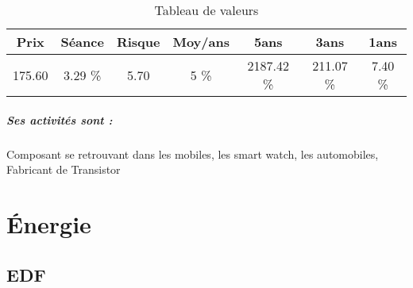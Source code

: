 \documentclass[11pt,a4paper]{report}%
\begin{document}
\begin{table}[H]
  \centering
    \begin{tabular}{|c|c|c|c|c|c|c|}
    \hline
    Prix & Séance & Risque  & Moy/ans & 5ans & 3ans & 1ans \\
    \hline
    175.60 &    3.29 \%    & 5.70 & 5 \% & 2187.42 \% & 211.07 \% & 7.40 \% \\
    \hline
    \end{tabular}%
        \label{tab:table_SOITEC}%
      \caption{Tableau de valeurs}
\end{table}%

\paragraph{Ses activités sont : } Composant se retrouvant dans les mobiles, les smart watch, les automobiles, Fabricant de Transistor 
    
    \newpage\chapter{Énergie}


\section{EDF}
\end{document}
